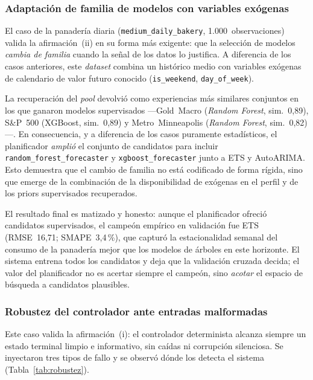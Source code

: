 
\subsubsection{Adaptación de familia de modelos con variables exógenas}
\label{sec:caso-exog}

El caso de la panadería diaria (\texttt{medium\_daily\_bakery}, 1.000~observaciones)
valida la afirmación~(ii) en su forma más exigente: que la selección de modelos
\emph{cambia de familia} cuando la señal de los datos lo justifica. A diferencia de los
casos anteriores, este \textit{dataset} combina un histórico medio con variables
exógenas de calendario de valor futuro conocido (\texttt{is\_weekend},
\texttt{day\_of\_week}).

La recuperación del \textit{pool} devolvió como experiencias más similares conjuntos en
los que ganaron modelos supervisados —Gold~Macro (\textit{Random Forest}, sim.~0,89),
S\&P~500 (XGBoost, sim.~0,89) y Metro~Minneapolis (\textit{Random Forest}, sim.~0,82)—.
En consecuencia, y a diferencia de los casos puramente estadísticos, el planificador
\emph{amplió} el conjunto de candidatos para incluir \texttt{random\_forest\_forecaster}
y \texttt{xgboost\_forecaster} junto a ETS y AutoARIMA. Esto demuestra que el cambio de
familia no está codificado de forma rígida, sino que emerge de la combinación de la
disponibilidad de exógenas en el perfil y de los priors supervisados recuperados.

El resultado final es matizado y honesto: aunque el planificador ofreció candidatos
supervisados, el campeón empírico en validación fue ETS (RMSE~16,71; SMAPE~3,4\,\%),
que capturó la estacionalidad semanal del consumo de la panadería mejor que los modelos
de árboles en este horizonte. El sistema entrena todos los candidatos y deja que la
validación cruzada decida; el valor del planificador no es acertar siempre el campeón,
sino \emph{acotar} el espacio de búsqueda a candidatos plausibles.


\subsubsection{Robustez del controlador ante entradas malformadas}
\label{sec:caso-robustez}

Este caso valida la afirmación~(i): el controlador determinista alcanza siempre un
estado terminal limpio e informativo, sin caídas ni corrupción silenciosa. Se
inyectaron tres tipos de fallo y se observó dónde los detecta el sistema
(Tabla~\ref{tab:robustez}).

